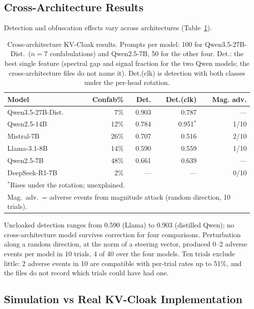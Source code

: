 \subsection{Cross-Architecture Results}

Detection and obfuscation effects vary across architectures
(Table~\ref{tab:cross_arch}).

\begin{table}[h]
\centering
\caption{Cross-architecture KV-Cloak results. Prompts per model: 100 for Qwen3.5-27B-Dist.\ ($n=7$ confabulations) and Qwen2.5-7B, 50 for the other four. Det.: the best single feature (spectral gap and signal fraction for the two Qwen models; the cross-architecture files do not name it). Det.(clk) is detection with both classes under the per-head rotation.}
\label{tab:cross_arch}
\begin{tabular}{lrrrr}
\toprule
Model & Confab\% & Det. & Det.(clk) & Mag. adv. \\
\midrule
Qwen3.5-27B-Dist. & 7\% & 0.903 & 0.787 & --- \\
Qwen2.5-14B & 12\% & 0.784 & 0.951$^*$ & 1/10 \\
Mistral-7B & 26\% & 0.707 & 0.516 & 2/10 \\
Llama-3.1-8B & 14\% & 0.590 & 0.559 & 1/10 \\
Qwen2.5-7B & 48\% & 0.661 & 0.639 & --- \\
DeepSeek-R1-7B & 2\% & --- & --- & 0/10 \\
\bottomrule
\multicolumn{5}{l}{\footnotesize $^*$Rises under the rotation; unexplained.} \\
\multicolumn{5}{l}{\footnotesize Mag.\ adv.\ = adverse events from magnitude attack (random direction, 10 trials).}
\end{tabular}
\end{table}

Uncloaked detection ranges from 0.590 (Llama) to 0.903 (distilled Qwen);
no cross-architecture model survives correction for four comparisons.
Perturbation along a random direction, at the norm of a steering vector,
produced 0--2 adverse events per model in 10 trials, 4 of 40 over the four
models. Ten trials exclude little: 2 adverse events in 10 are compatible
with per-trial rates up to 51\%, and the files do not record which trials
could have had one.

\subsection{Simulation vs Real KV-Cloak Implementation}
\label{sec:real}

